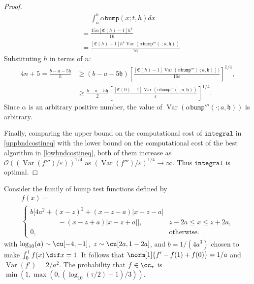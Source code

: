 \documentclass[draft]{iitthesis}
\DeclareMathOperator{\Var}{Var}
\theoremstyle{definition}
\theoremstyle{remark}
\begin{document}
\begin{proof}
\begin{subequations}
\begin{align*}
     &=\int_{a}^{b}\alpha\texttt{bump}(x;t,h)dx\\
     &=\frac{15\alpha[\mathfrak{C}(h)-1]h^4}{16}\\
     &=\frac{[\mathfrak{C}(h)-1]h^4\Var(\alpha\texttt{bump}'''(\cdot;a,\mathfrak{h}))}{16}
  \end{align*}
  \end{subequations}
  Substituting $h$  in terms of $n$:
      \begin{align*}
        4n+5=\frac{b-a-5\mathfrak{h}}{h}&\ge(b-a-5\mathfrak{h})\left[\frac{[\mathfrak{C}(h)-1]\Var(\alpha \texttt{bump}'''(\cdot;a,\mathfrak{h})))}{16\varepsilon}\right]^{1/4},\\
        &\ge\frac{b-a-5\mathfrak{h}}{2}\left[\frac{[\mathfrak{C}(0)-1]\Var(\alpha \texttt{bump}'''(\cdot;a,\mathfrak{h}))}{\varepsilon}\right]^{1/4}.
    \end{align*}
    Since $\alpha$ is an arbitrary positive number, the value of $\Var(\alpha \texttt{bump}'''(\cdot;a,\mathfrak{h}))$ is arbitrary.

    Finally, comparing the upper bound on the computational cost of $\texttt{integral}$ in \eqref{uppbndcostineq} with the lower bound on the computational cost of the best algorithm in \eqref{lowbndcostineq}, both of them increase as $\mathcal{O}((\Var(f''')/\varepsilon))^{1/4}$ as $(\Var(f''')/\varepsilon)^{1/4}\rightarrow \infty$. Thus $\texttt{integral}$ is optimal.
\end{proof}




Consider the family of bump test functions defined by
\begin{multline}\label{testfun}
f(x)= \\
\begin{cases}
\displaystyle  b[4a^2 + (x-z)^2 + (x-z-a)|x-z-a|\\
\qquad \qquad -(x-z+a)|x-z+a|], & z-2a\leq x\leq z+2a,\\[2ex]
\displaystyle  0, & \text{otherwise}.
\end{cases}
\end{multline}
with  $\log_{10}(a) \sim \cu[-4,-1]$, $z \sim \cu[2a,1-2a]$, and $b=1/(4a^3)$ chosen to make $\int_0^1 f(x) \, \dif x = 1$.  It follows that $\norm[1]{f'-f(1)+f(0)}=1/a$ and $\Var(f')=2/a^2$.  The probability that $f \in \cc_{\tau}$ is $\min\left(1,\max(0,\left(\log_{10}(\tau/2)-1\right)/3)\right).$
\end{document}
